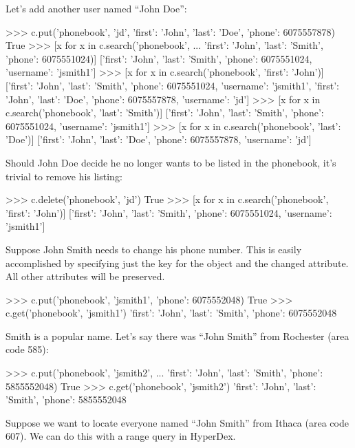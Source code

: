 Let's add another user named ``John Doe'':

\begin{pythoncode}
>>> c.put('phonebook', 'jd', {'first': 'John', 'last': 'Doe', 'phone': 6075557878})
True
>>> [x for x in c.search('phonebook',
...  {'first': 'John', 'last': 'Smith', 'phone': 6075551024})]
[{'first': 'John',
  'last': 'Smith',
  'phone': 6075551024,
  'username': 'jsmith1'}]
>>> [x for x in c.search('phonebook', {'first': 'John'})]
[{'first': 'John',
  'last': 'Smith',
  'phone': 6075551024,
  'username': 'jsmith1'},
 {'first': 'John',
  'last': 'Doe',
  'phone': 6075557878,
  'username': 'jd'}]
>>> [x for x in c.search('phonebook', {'last': 'Smith'})]
[{'first': 'John',
  'last': 'Smith',
  'phone': 6075551024,
  'username': 'jsmith1'}]
>>> [x for x in c.search('phonebook', {'last': 'Doe'})]
[{'first': 'John',
  'last': 'Doe',
  'phone': 6075557878,
  'username': 'jd'}]
\end{pythoncode}

Should John Doe decide he no longer wants to be listed in the phonebook, it's
trivial to remove his listing:

\begin{pythoncode}
>>> c.delete('phonebook', 'jd')
True
>>> [x for x in c.search('phonebook', {'first': 'John'})]
[{'first': 'John',
  'last': 'Smith',
  'phone': 6075551024,
  'username': 'jsmith1'}]
\end{pythoncode}

Suppose John Smith needs to change his phone number. This is easily accomplished
by specifying just the key for the object and the changed attribute.  All other
attributes will be preserved.

\begin{pythoncode}
>>> c.put('phonebook', 'jsmith1', {'phone': 6075552048})
True
>>> c.get('phonebook', 'jsmith1')
{'first': 'John',
  'last': 'Smith',
  'phone': 6075552048}
\end{pythoncode}

Smith is a popular name.  Let's say there was ``John Smith'' from Rochester
(area code 585):

\begin{pythoncode}
>>> c.put('phonebook', 'jsmith2',
...          {'first': 'John', 'last': 'Smith', 'phone': 5855552048})
True
>>> c.get('phonebook', 'jsmith2')
{'first': 'John',
  'last': 'Smith',
  'phone': 5855552048}
\end{pythoncode}

Suppose we want to locate everyone named ``John Smith'' from Ithaca (area code
607). We can do this with a range query in HyperDex.

